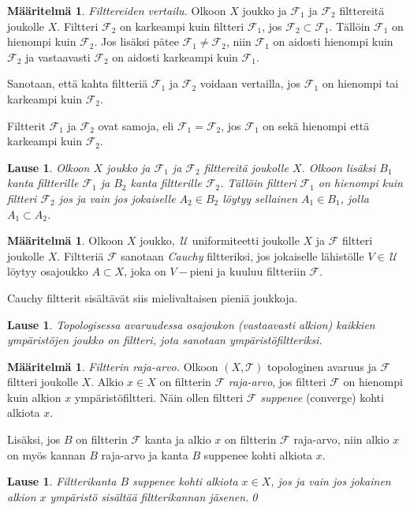 \documentclass[12pt,a4paper,leqno]{report}
\newcommand{\U}{\,\mathcal{U}}
\newcommand{\T}{\mathcal{T}}
\newcommand{\F}{\mathcal{F}}
\theoremstyle{plain}
\newtheorem{lause}[equation]{Lause}
\theoremstyle{definition}
\newtheorem{maar}[equation]{Määritelmä}
\theoremstyle{remark}
\begin{document}
\begin{maar}
\emph{Filttereiden vertailu.}
Olkoon $X$ joukko ja $\F_1$ ja $\F_2$ filttereitä joukolle $X$. 
Filtteri $\F_2$ on karkeampi kuin filtteri $\F_1$, jos $\F_2\subset \F_1$. 
Tällöin $\F_1$ on hienompi kuin $\F_2$. 
Jos lisäksi pätee $\F_1\neq\F_2$, niin $\F_1$ on aidosti hienompi kuin $\F_2$ ja vastaavasti $\F_2$ on aidosti karkeampi kuin $\F_1$. 

Sanotaan, että kahta filtteriä $\F_1$ ja $\F_2$ voidaan vertailla, 
jos $\F_1$ on hienompi tai karkeampi kuin $\F_2$. 

Filtterit $\F_1$ ja $\F_2$ ovat samoja, eli $\F_1=\F_2$,
jos $\F_1$ on sekä hienompi että karkeampi kuin $\F_2$.
\end{maar}
\begin{lause}\label{filtterikantavertailu}
Olkoon $X$ joukko ja $\F_1$ ja $\F_2$ filttereitä joukolle $X$. 
Olkoon lisäksi $B_1$ kanta filtterille $\F_1$ ja $B_2$ kanta filtterille $\F_2$. 
Tällöin filtteri $\F_1$ on hienompi kuin filtteri $\F_2$ 
jos ja vain jos jokaiselle $A_2\in B_2$ löytyy 
sellainen $A_1\in B_1$, jolla $A_1\subset A_2$.
\end{lause}
\begin{maar}\label{Cauchy_filtteri}
Olkoon $X$ joukko, $\U$ uniformiteetti joukolle $X$ ja $\F$ filtteri joukolle $X$. 
Filtteriä $\F$ sanotaan \emph{Cauchy} filtteriksi, 
jos jokaiselle lähistölle $V\in\U$ löytyy osajoukko $A\subset X$, 
joka on $V-$pieni ja kuuluu filtteriin $\F$. %
\end{maar}
\noindent Cauchy filtterit sisältävät siis mielivaltaisen pieniä joukkoja. 
\begin{lause}
Topologisessa avaruudessa osajoukon (vastaavasti alkion) kaikkien ympäristöjen joukko on filtteri, jota sanotaan ympäristöfiltteriksi.
\end{lause}
\begin{maar}
\emph{Filtterin raja-arvo.} 
Olkoon $(X,\T)$ topologinen avaruus ja $\F$ filtteri joukolle $X$. 
Alkio $x\in X$ on filtterin $\F$ \emph{raja-arvo}, 
jos filtteri $\F$ on hienompi kuin 
alkion $x$ ympäristöfiltteri. %
Näin ollen filtteri $\F$ \emph{suppenee} (converge) kohti alkiota $x$. 

Lisäksi, jos $B$ on filtterin $\F$ kanta 
ja alkio $x$ on filtterin $\F$ raja-arvo, 
niin alkio $x$ on myös kannan $B$ raja-arvo ja 
kanta $B$ suppenee kohti alkiota $x$.
\end{maar}
\begin{lause}
Filtterikanta $B$ suppenee kohti alkiota $x\in X$, jos ja vain jos 
jokainen alkion $x$ ympäristö sisältää filtterikannan jäsenen.\qed
\end{lause}
\end{document}
